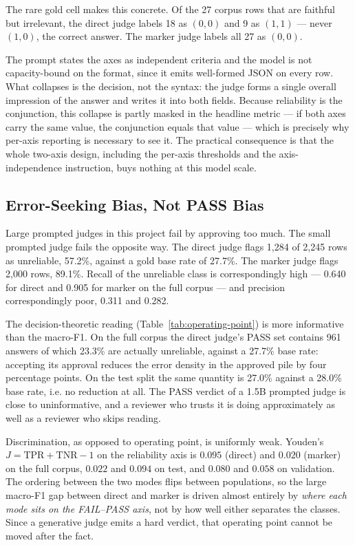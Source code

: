 \documentclass{zapiski}
\begin{document}
The rare gold cell makes this concrete. Of the 27 corpus rows that are
faithful but irrelevant, the direct judge labels 18 as $(0,0)$ and 9 as
$(1,1)$ --- never $(1,0)$, the correct answer. The marker judge labels all 27
as $(0,0)$.

The prompt states the axes as independent criteria and the model is not
capacity-bound on the format, since it emits well-formed JSON on every row.
What collapses is the decision, not the syntax: the judge forms a single
overall impression of the answer and writes it into both fields. Because
reliability is the conjunction, this collapse is partly masked in the headline
metric --- if both axes carry the same value, the conjunction equals that
value --- which is precisely why per-axis reporting is necessary to see it.
The practical consequence is that the whole two-axis design, including the
per-axis thresholds and the axis-independence instruction, buys nothing at
this model scale.

\subsection{Error-Seeking Bias, Not PASS Bias}
\label{sec:results-bias}

Large prompted judges in this project fail by approving too much. The small
prompted judge fails the opposite way. The direct judge flags 1,284 of 2,245
rows as unreliable, 57.2\%, against a gold base rate of 27.7\%. The marker
judge flags 2,000 rows, 89.1\%. Recall of the unreliable class is
correspondingly high --- 0.640 for direct and 0.905 for marker on the full
corpus --- and precision correspondingly poor, 0.311 and 0.282.

The decision-theoretic reading (Table~\ref{tab:operating-point}) is more
informative than the macro-F1. On the
full corpus the direct judge's PASS set contains 961 answers of which 23.3\%
are actually unreliable, against a 27.7\% base rate: accepting its approval
reduces the error density in the approved pile by four percentage points. On
the test split the same quantity is 27.0\% against a 28.0\% base rate, i.e.
no reduction at all. The PASS verdict of a 1.5B prompted judge is close to
uninformative, and a reviewer who trusts it is doing approximately as well as
a reviewer who skips reading.

Discrimination, as opposed to operating point, is uniformly weak. Youden's
$J = \mathrm{TPR}+\mathrm{TNR}-1$ on the reliability axis is $0.095$ (direct)
and $0.020$ (marker) on the full corpus, $0.022$ and $0.094$ on test, and
$0.080$ and $0.058$ on validation. The ordering between the two modes flips
between populations, so the large macro-F1 gap between direct and marker is
driven almost entirely by \emph{where each mode sits on the FAIL--PASS axis},
not by how well either separates the classes. Since a generative judge emits
a hard verdict, that operating point cannot be moved after the fact.
\end{document}
